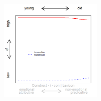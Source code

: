 \documentclass[12pt, table]{beamer}
\begin{document}
\begin{frame}
\begin{minipage}[t]{\linewidth}
\begin{minipage}{.45\linewidth}
\begin{tabular}{cccccccccc }
\end{tabular}
\end{minipage}
\hfill
\begin{minipage}{.45\linewidth}
\begin{figure}
\includegraphics[width=5cm]{images/LangChang21.png}
\end{figure}
\end{minipage}
\end{minipage}
\end{frame}
\end{document}
